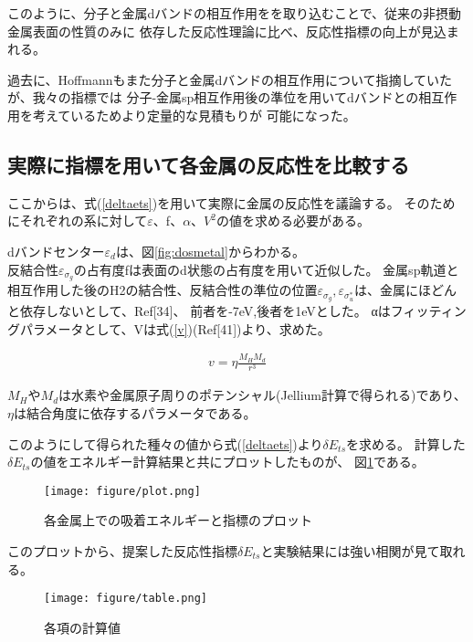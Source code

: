 \documentclass[12pt]{ltjsarticle}
\begin{document}
このように、分子と金属dバンドの相互作用をを取り込むことで、従来の非摂動金属表面の性質のみに
依存した反応性理論に比べ、反応性指標の向上が見込まれる。

過去に、Hoffmannもまた分子と金属dバンドの相互作用について指摘していたが、我々の指標では
分子-金属sp相互作用後の準位を用いてdバンドとの相互作用を考えているためより定量的な見積もりが
可能になった。

\subsection{実際に指標を用いて各金属の反応性を比較する}
ここからは、式(\ref{deltaets})を用いて実際に金属の反応性を議論する。
そのためにそれぞれの系に対して$\varepsilon$、f、$\alpha$、$V^2$の値を求める必要がある。

dバンドセンター$\varepsilon_d$は、図\ref{fig:dosmetal}からわかる。\\
反結合性$\varepsilon _{\sigma_g}$の占有度fは表面のd状態の占有度を用いて近似した。
金属sp軌道と相互作用した後のH2の結合性、反結合性の準位の位置$\varepsilon _{\sigma_g},
\varepsilon _{\sigma_u^*}$は、金属にほどんと依存しないとして、Ref[34]、
前者を-7eV,後者を1eVとした。
αはフィッティングパラメータとして、Vは式(\ref{v})(Ref[41])より、求めた。

\begin{eqnarray}
    \label{v}
    v = \eta \frac{ M_H M_d }{r^3}
\end{eqnarray}

$M_H$や$M_d$は水素や金属原子周りのポテンシャル(Jellium計算で得られる)であり、
$\eta$は結合角度に依存するパラメータである。

このようにして得られた種々の値から式(\ref{deltaets})より$\delta E_{ts}$を求める。
計算した$\delta E_{ts}$の値をエネルギー計算結果と共にプロットしたものが、
図\ref{fig:plot}である。

\begin{figure}[hbtp]
    \begin{center}
     \texttt{[image: figure/plot.png]}
    \end{center}
    \caption{各金属上での吸着エネルギーと指標のプロット}
    \label{fig:plot}
\end{figure}

このプロットから、提案した反応性指標$\delta E_{ts}$と実験結果には強い相関が見て取れる。

\begin{figure}[hbtp]
    \begin{center}
     \texttt{[image: figure/table.png]}
    \end{center}
    \caption{各項の計算値}
    \label{fig:table}
\end{figure}
\end{document}
